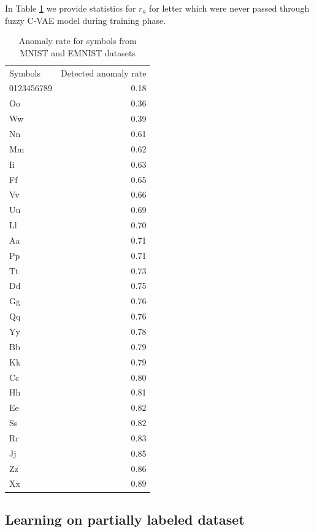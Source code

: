 \documentclass[runningheads]{llncs}
\begin{document}
In Table \ref{table-anomaly} we provide statistics for $r_{a}$ for letter which were never passed through fuzzy C-VAE model during training phase.

\begin{table}[h!]
    \centering
    \begin{tabular}{lr}
        Symbols & Detected anomaly rate \\
        0123456789 & 0.18 \\
        Oo & 0.36 \\
        Ww & 0.39 \\
        Nn & 0.61 \\
        Mm & 0.62 \\
        Ii & 0.63 \\
        Ff & 0.65 \\
        Vv & 0.66 \\
        Uu & 0.69 \\
        Ll & 0.70 \\
        Aa & 0.71 \\
        Pp & 0.71 \\
        Tt & 0.73 \\
        Dd & 0.75 \\
        Gg & 0.76 \\
        Qq & 0.76 \\
        Yy & 0.78 \\
        Bb & 0.79 \\
        Kk & 0.79 \\
        Cc & 0.80 \\
        Hh & 0.81 \\
        Ee & 0.82 \\
        Ss & 0.82 \\
        Rr & 0.83 \\
        Jj & 0.85 \\
        Zz & 0.86 \\
        Xx & 0.89 \\
    \end{tabular}        
    \caption{Anomaly rate for symbols from MNIST and EMNIST datasets}
    \label{table-anomaly}
\end{table}



\subsection{Learning on partially labeled dataset}
\end{document}
